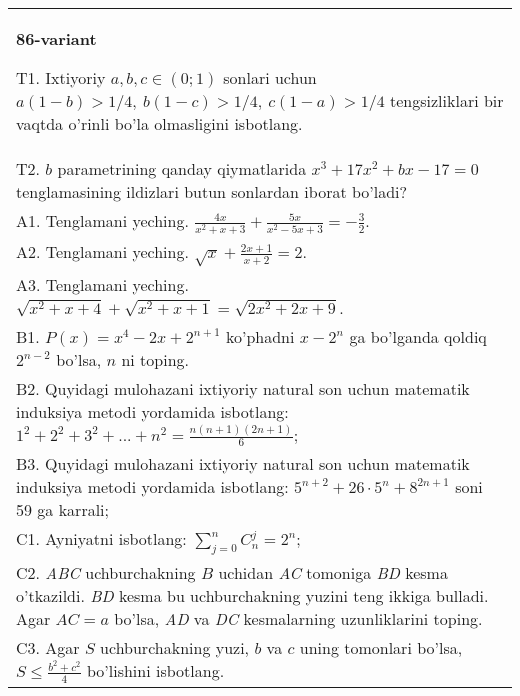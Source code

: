 \documentclass{article}
\begin{document}
\begin{tabular}{m{17cm}}
\textbf{86-variant}
\newline

T1. Ixtiyoriy \(a,b,c \in (0;1)\) sonlari uchun \(a(1 - b) > 1/4,\ b(1 - c) > 1/4,\ c(1 - a) > 1/4\) tengsizliklari bir vaqtda o'rinli bo'la olmasligini isbotlang. \\
T2. \(b\) parametrining qanday qiymatlarida \(x^{3} + 17x^{2} + bx - 17 = 0\) tenglamasining ildizlari butun sonlardan iborat bo'ladi? \\
A1. Tenglamani yeching. \(\frac{4x}{x^{2} + x + 3} + \frac{5x}{x^{2} - 5x + 3} = - \frac{3}{2}\). \\
A2. Tenglamani yeching. \(\sqrt{x} + \frac{2x + 1}{x + 2} = 2\). \\
A3. Tenglamani yeching. \(\sqrt{x^{2} + x + 4} + \sqrt{x^{2} + x + 1} = \sqrt{2x^{2} + 2x + 9}\). \\
B1. \(P(x) = x^{4} - 2x + 2^{n + 1}\) ko'phadni \(x - 2^{n}\) ga bo'lganda qoldiq \(2^{n - 2}\) bo'lsa, \(n\) ni toping. \\
B2. Quyidagi mulohazani ixtiyoriy natural son uchun matematik induksiya metodi yordamida isbotlang: \(1^{2} + 2^{2} + 3^{2} + ... + n^{2} = \frac{n(n + 1)(2n + 1)}{6}\); \\
B3. Quyidagi mulohazani ixtiyoriy natural son uchun matematik induksiya metodi yordamida isbotlang: \(5^{n + 2} + 26 \cdot 5^{n} + 8^{2n + 1}\) soni 59 ga karrali; \\
C1. Ayniyatni isbotlang: \(\sum_{j = 0}^{n}C_{n}^{j} = 2^{n}\); \\
C2. \emph{ABC} uchburchakning \(B\) uchidan \emph{AC} tomoniga \emph{BD} kesma o'tkazildi. \emph{BD} kesma bu uchburchakning yuzini teng ikkiga bulladi. Agar \(AC = a\) bo'lsa, \emph{AD} va \emph{DC} kesmalarning uzunliklarini toping. \\
C3. Agar \(S\) uchburchakning yuzi, \(b\) va \(c\) uning tomonlari bo'lsa, \(S \leq \frac{b^{2} + c^{2}}{4}\) bo'lishini isbotlang. \\

\end{tabular}
\vspace{1cm}
\end{document}
